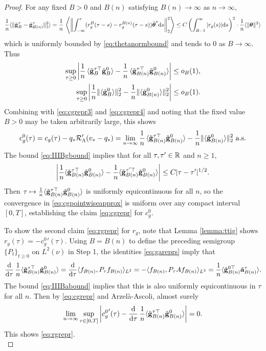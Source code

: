 \begin{proof}
For any fixed $B>0$ and $B(n)$ satisfying $B(n) \to \infty$ as $n \to \infty$,
\[\frac{1}{n}\langle \|\tilde {\mathbf{g}}_B^\tau-\tilde {\mathbf{g}}_{B(n)}^\tau\|_2^2 \rangle
=\frac{1}{n}\,\left\langle\left\|\int_{-\infty}^\tau
(r_g^B(\tau-s)-r_g^{B(n)}(\tau-s))\tilde{\boldsymbol{\theta}}^s \mathrm{d} s\right\|_2^2\right\rangle
\leq C\left(\int_{B-1}^\infty |r_g(s)| \mathrm{d} s\right)^2
\cdot \frac{1}{n}\langle \|\boldsymbol{\theta}\|^2 \rangle\]
which is uniformly bounded by \eqref{eq:thetanormbound}
and tends to 0 as $B \to \infty$. Thus
\begin{align*}
\sup_{\tau \geq 0} \left|\frac{1}{n}\,\langle \tilde{\mathbf{g}}_B^{\tau\top}
\tilde {\mathbf{g}}_B^0 \rangle
-\frac{1}{n}\,\langle \tilde{\mathbf{g}}_{B(n)}^{\tau\top}\tilde {\mathbf{g}}_{B(n)}^0
\rangle\right|& \leq o_B(1),\\
\sup_{\tau \geq 0} \left|\frac{1}{n}\|\langle \tilde{\mathbf{g}}_B^0
\rangle \|_2^2
-\frac{1}{n}\|\langle \tilde{\mathbf{g}}_{B(n)}^0\rangle\|_2^2\right| & \leq o_B(1).
\end{align*}
Combining with \eqref{eq:cgrepr3} and \eqref{eq:cgrepr4}
and noting that the fixed value $B>0$ may be taken arbitrarily large, this shows
\begin{equation}\label{eq:cgpointwiseapprox}
c_g^0(\tau)=c_g(\tau)-q_*\mathcal{R}_\Lambda'(v_*-q_*)
=\lim_{n \to \infty} \frac{1}{n}\,\langle \tilde{\mathbf{g}}_{B(n)}^{\tau\top}
\tilde {\mathbf{g}}_{B(n)}^0 \rangle
-\frac{1}{n}\|\langle \tilde{\mathbf{g}}_{B(n)}^0\rangle\|_2^2 \text{ a.s.}
\end{equation}
The bound \eqref{eq:IIIBgbound} implies that
for all $\tau,\tau' \in \mathbb{R}$ and $n \geq 1$,
\[\left|\frac{1}{n}\langle \tilde{\mathbf{g}}_{B(n)}^{\tau\top} \tilde {\mathbf{g}}_{B(n)}^0
\rangle-\frac{1}{n}\langle \tilde{\mathbf{g}}_{B(n)}^{\tau'\top}
\tilde{\mathbf{g}}_{B(n)}^0 \rangle\right|
\leq C|\tau-\tau'|^{1/2}.\]
Then $\tau \mapsto \frac{1}{n}\langle \tilde{\mathbf{g}}_{B(n)}^{\tau\top}
\tilde{\mathbf{g}}_{B(n)}^0 \rangle$
is uniformly equicontinuous for all $n$, so the convergence in
\eqref{eq:cgpointwiseapprox} is
uniform over any compact interval $[0,T]$,
establishing the claim \eqref{eq:cgrepr} for $c_g^0$.

To show the second claim \eqref{eq:rgrepr} for $r_g$,
note that Lemma \ref{lemma:ttig} shows $r_g(\tau)={-}{c_g^0}'(\tau)$. Using
$B=B(n)$ to define the preceding semigroup $\{P_t\}_{t \geq 0}$ on $L^2(\nu)$
in Step 1, the identities \eqref{eq:gareprs} imply that
\[\frac{\mathrm{d}}{\mathrm{d}\tau}\,\frac{1}{n}\langle \tilde {\mathbf{g}}_{B(n)}^{\tau\top}
\tilde {\mathbf{g}}_{B(n)}^0 \rangle
=\frac{\mathrm{d}}{\mathrm{d}\tau} \langle f_{B(n)},P_\tau f_{B(n)} \rangle_{L^2}
={-}\langle f_{B(n)},P_\tau Af_{B(n)} \rangle_{L^2}
=\frac{1}{n}\langle \tilde {\mathbf{g}}_{B(n)}^{0\top}\tilde {\mathbf{a}}_{B(n)}^\tau \rangle.\]
The bound \eqref{eq:IIIBabound} implies that this is also uniformly
equicontinuous in $\tau$ for all $n$. Then by \eqref{eq:cgrepr} and
Arzel\`a-Ascoli, almost surely
\[\lim_{n \to \infty} \sup_{\tau \in [0,T]} \left|{c_g^0}'(\tau)
-\frac{\mathrm{d}}{\mathrm{d}\tau}\,\frac{1}{n}\langle \tilde {\mathbf{g}}_{B(n)}^{\tau\top}
\tilde {\mathbf{g}}_{B(n)}^0 \rangle\right|=0.\]
This shows \eqref{eq:rgrepr}.\\


\end{proof}
